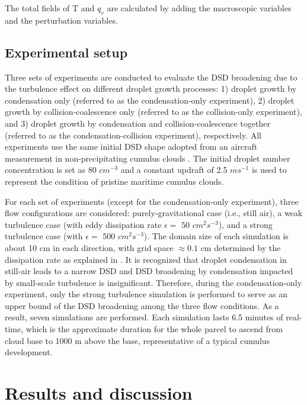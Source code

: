 The total fields of T and $q_v$ are calculated by adding the macroscopic variables and the perturbation variables. 
 
\subsection{Experimental setup}

Three sets of experiments are conducted to evaluate the DSD broadening due to the turbulence effect on different droplet growth processes: 1) droplet growth by condensation only (referred to as the condensation-only experiment), 2) droplet growth by collision-coalescence only (referred to as the collision-only experiment), and 3) droplet growth by condensation and collision-coalescence together (referred to as the condensation-collision experiment), respectively. All experiments use the same initial DSD shape adopted from an aircraft measurement in non-precipitating cumulus clouds \citep{Raga1990}. The initial droplet number concentration is set as 80 $cm^{-3}$ and a constant updraft of 2.5 $ms^{-1}$ is used to represent the condition of pristine maritime cumulus clouds. 

For each set of experiments (except for the condensation-only experiment), three flow configurations are considered: purely-gravitational case (i.e., still air), a weak turbulence case (with eddy dissipation rate $\epsilon= $ 50 $cm^2 s^{-3}$), and a strong turbulence case (with $\epsilon=$ 500 $cm^2 s^{-3}$). The domain size of each simulation is about 10 cm in each direction, with grid space $\approx 0.1$ cm determined by the dissipation rate as explained in \citet{Chen2016}. It is recognized that droplet condensation in still-air leads to a narrow DSD and DSD broadening by condensation impacted by small-scale turbulence is insignificant. Therefore, during the condensation-only experiment, only the strong turbulence simulation is performed to serve as an upper bound of the DSD broadening among the three flow conditions. As a result, seven simulations are performed. Each simulation lasts 6.5 minutes of real-time, which is the approximate duration for the whole parcel to ascend from cloud base to 1000 m above the base, representative of a typical cumulus development. 

\section{Results and discussion}\label{sec:ch4_result}

